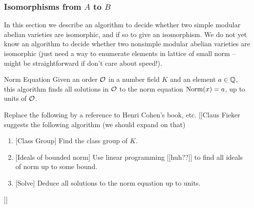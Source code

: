 \documentclass{article}
\begin{document}
\subsubsection{Isomorphisms from $A$ to $B$}

In this section we describe an algorithm to decide whether two simple
modular abelian varieties are isomorphic, and if so to give an
isomorphism.  We do not yet know an algorithm to decide whether two
nonsimple modular abelian varieties are isomorphic (just need a way
to enumerate elements in lattice of small norm -- might be straightforward
if don't care about speed!).

\begin{algorithm}{Norm Equation}
Given an order $\mathcal{O}$ in a number field $K$ and an element $a\in \mathbb{Q}$,
this algorithm finds all solutions in $\mathcal{O}$ to the norm equation
$\operatorname{Norm}(x)=a$, up to units of $\mathcal{O}$.

Replace the following by a reference to Henri Cohen's book, etc.
[[Claus Fieker suggests the following algorithm (we should expand on that)
\begin{enumerate}
\item{} [Class Group] Find the class group of $K$.
\item{} [Ideals of bounded norm] Use linear programming [[huh??]] to find all ideals of
norm up to some bound.
\item{} [Solve] Deduce all solutions to the norm equation up to units.
\end{enumerate}
\end{algorithm}
]]
\end{document}
